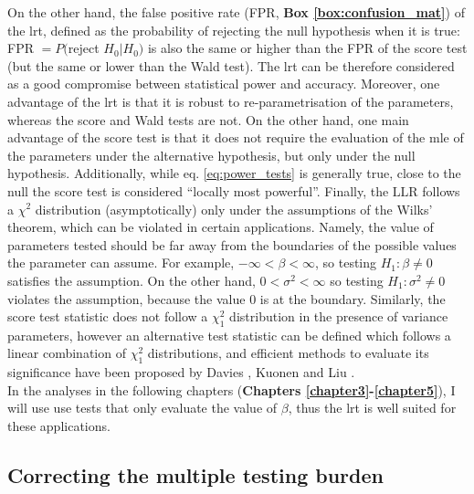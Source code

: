 On the other hand, the false positive rate (FPR, \textbf{Box \ref{box:confusion_mat}}) of the \gls{lrt}, defined as the probability of rejecting the null hypothesis when it is true: FPR $= P($reject $H_0 | H_0)$ is also the same or higher than the FPR of the score test (but the same or lower than the Wald test).
The \gls{lrt} can be therefore considered as a good compromise between statistical power and accuracy.
Moreover, one advantage of the \gls{lrt} is that it is robust to re-parametrisation of the parameters, whereas the score and Wald tests are not. 
On the other hand, one main advantage of the score test is that it does not require the evaluation of the \gls{mle} of the parameters under the alternative hypothesis, but only under the null hypothesis.
Additionally, while eq. \eqref{eq:power_tests} is generally true, close to the null the score test is considered “locally most powerful”.
Finally, the $\mathrm{LLR}$ follows a $\chi^2$ distribution (asymptotically) only under the assumptions of the Wilks' theorem, which can be violated in certain applications.
Namely, the value of parameters tested should be far away from the boundaries of the possible values the parameter can assume.
For example, $-\infty < \beta < \infty$, so testing $H_1: \beta \neq 0$ satisfies the assumption.
On the other hand, $0 < \sigma^2 < \infty$ so testing $H_1: \sigma^2 \neq 0$ violates the assumption, because the value $0$ is at the boundary.
Similarly, the score test statistic does not follow a $\chi^2_1$ distribution in the presence of variance parameters, however an alternative test statistic can be defined which follows a linear combination of $\chi^2_1$ distributions, and efficient methods to evaluate its significance have been proposed by Davies \cite{davies1980algorithm}, Kuonen \cite{kuonen1999miscellanea} and Liu \cite{liu2009new, lee2012optimal}. \\

In the analyses in the following chapters (\textbf{Chapters \ref{chapter3}-\ref{chapter5}}), I will use use tests that only evaluate the value of $\beta$, thus the \gls{lrt} is well suited for these applications.


\subsection{Correcting the multiple testing burden}
\label{sec:multiple_testing}

